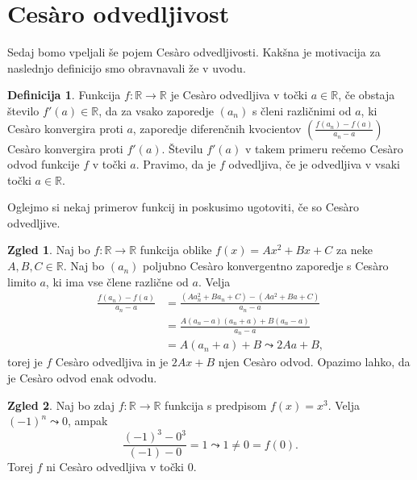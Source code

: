 \documentclass[a4paper,12pt]{article}
\theoremstyle{definition}
\newtheorem{definicija}{Definicija}
\newtheorem{zgled}{Zgled}
\theoremstyle{plain}
\begin{document}
\section{Ces\`{a}ro odvedljivost}

Sedaj bomo vpeljali še pojem Ces\`{a}ro odvedljivosti. Kakšna je motivacija za naslednjo definicijo smo obravnavali že v uvodu.

\begin{definicija}
    Funkcija $f: \mathbb{R} \rightarrow \mathbb{R}$ je Ces\`{a}ro odvedljiva v točki $a \in \mathbb{R}$, če obstaja število $f'(a) \in \mathbb{R}$, da za vsako zaporedje $(a_n)$ s členi različnimi od $a$, ki Ces\`{a}ro konvergira proti $a$, zaporedje diferenčnih kvocientov $(\frac{f(a_n)-f(a)}{a_n-a})$ Ces\`{a}ro konvergira proti $f'(a)$. Številu $f'(a)$ v takem primeru rečemo Ces\`{a}ro odvod funkcije $f$ v točki $a$. Pravimo, da je $f$ odvedljiva, če je odvedljiva v vsaki točki $a \in \mathbb{R}$.
\end{definicija}

Oglejmo si nekaj primerov funkcij in poskusimo ugotoviti, če so Ces\`{a}ro odvedljive.

\begin{zgled}
    \label{vseodv}
    Naj bo $f: \mathbb{R} \rightarrow \mathbb{R}$ funkcija oblike $f(x) = Ax^2 + Bx + C$ za neke $A, B, C \in \mathbb{R}$. Naj bo $(a_n)$ poljubno Ces\`{a}ro konvergentno zaporedje s Ces\`{a}ro limito $a$, ki ima vse člene različne od $a$. Velja 
    \begin{align*}
        \frac{f(a_n)-f(a)}{a_n-a} &= \frac{(Aa_n^2 + Ba_n + C)-(Aa^2 + Ba + C)}{a_n-a}\\
        &= \frac{A(a_n-a)(a_n+a) + B(a_n-a)}{a_n-a}\\
        &= A(a_n+a) + B \leadsto 2Aa + B,
    \end{align*}
    torej je $f$ Ces\`{a}ro odvedljiva in je $2Ax + B$ njen Ces\`{a}ro odvod. Opazimo lahko, da je Ces\`{a}ro odvod enak odvodu.
\end{zgled}

\begin{zgled}
    Naj bo zdaj $f: \mathbb{R} \rightarrow \mathbb{R}$ funkcija s predpisom $f(x) = x^3$. Velja $(-1)^n \leadsto 0$, ampak 
    $$\frac{(-1)^3-0^3}{(-1)-0} = 1 \leadsto 1 \neq 0 = f(0).$$ 
    Torej $f$ ni Ces\`{a}ro odvedljiva v točki 0.
\end{zgled}
\end{document}
